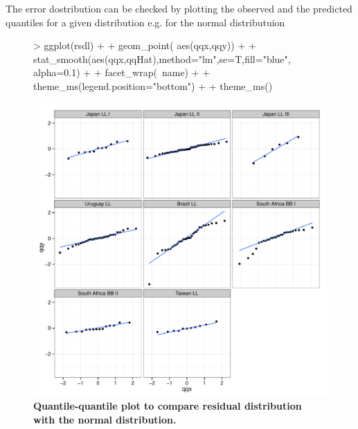 \documentclass[shortnames,nojss,article]{jss}
\begin{document}
The error dostribution can be checked by plotting the observed and the predicted quantiles for a given distribution e.g. for the normal distributuion
\begin{figure}\begin{center}
\begin{Schunk}
\begin{Sinput}
> ggplot(rsdl)                                           +
+   geom_point( aes(qqx,qqy))                            +
+   stat_smooth(aes(qqx,qqHat),method="lm",se=T,fill="blue", alpha=0.1)         +
+   facet_wrap(~name)                                    +
+   theme_ms(legend.position="bottom")                   +
+              theme_ms()
\end{Sinput}
\end{Schunk}
\includegraphics{diags-021}
\caption{\bf{Quantile-quantile plot to compare residual distribution with the normal distribution.}}
\label{residual:4}
\end{center}\end{figure}
\end{document}
